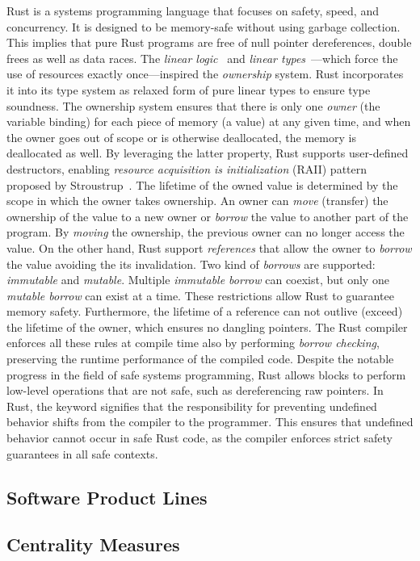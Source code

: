 Rust is a systems programming language that focuses on safety, speed, and concurrency. It is designed to be memory-safe without using garbage collection. 
This implies that pure Rust programs are free of null pointer dereferences, double frees as well as data races.
The \emph{linear logic}~\cite{Girard87, Girard95} and \emph{linear types}~\cite{Wadler90, Odersky92}---which force the use of resources exactly once---inspired the \emph{ownership} system.
Rust incorporates it into its type system as relaxed form of pure linear types to ensure type soundness.
The ownership system ensures that there is only one \emph{owner} (the variable binding) for each piece of memory (a value) at any given time, and when the owner goes out of scope or is otherwise deallocated, the memory is deallocated as well. By leveraging the latter property, Rust supports user-defined destructors, enabling \emph{resource acquisition is initialization} (RAII) pattern proposed by Stroustrup~\cite{Stroustrup94}.
The lifetime of the owned value is determined by the scope in which the owner takes ownership.
An owner can \emph{move} (transfer) the ownership of the value to a new owner or \emph{borrow} the value to another part of the program.
By \emph{moving} the ownership, the previous owner can no longer access the value.
On the other hand, Rust support \emph{references} that allow the owner to \emph{borrow} the value avoiding the its invalidation.
Two kind of \emph{borrows} are supported: \emph{immutable} and \emph{mutable}.
Multiple \emph{immutable borrow} can coexist, but only one \emph{mutable borrow} can exist at a time. 
These restrictions allow Rust to guarantee memory safety. Furthermore, the lifetime of a reference can not outlive (exceed) the lifetime of the owner, which ensures no dangling pointers.
The Rust compiler enforces all these rules at compile time also by performing \emph{borrow checking}, preserving the runtime performance of the compiled code.
Despite the notable progress in the field of safe systems programming, Rust allows  blocks to perform low-level operations that are not safe, such as dereferencing raw pointers.
In Rust, the  keyword signifies that the responsibility for preventing undefined behavior shifts from the compiler to the programmer. This ensures that undefined behavior cannot occur in safe Rust code, as the compiler enforces strict safety guarantees in all safe contexts.

\subsection{Software Product Lines}\label{subsec:bg:spl}


\subsection{Centrality Measures}\label{subsec:bg:centrality}


